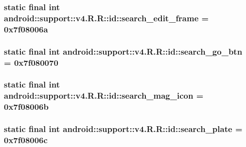 \hypertarget{classandroid_1_1support_1_1v4_1_1_r_1_1id_496a0719e8a5ad50616c8ab01c37c6da}{
\subsubsection[{search\_\-edit\_\-frame}]{\setlength{\rightskip}{0pt plus 5cm}static final int android::support::v4.R.R::id::search\_\-edit\_\-frame = 0x7f08006a}}
\label{classandroid_1_1support_1_1v4_1_1_r_1_1id_496a0719e8a5ad50616c8ab01c37c6da}


\hypertarget{classandroid_1_1support_1_1v4_1_1_r_1_1id_25f73c2a61d9352245d79baeccd50e54}{
\subsubsection[{search\_\-go\_\-btn}]{\setlength{\rightskip}{0pt plus 5cm}static final int android::support::v4.R.R::id::search\_\-go\_\-btn = 0x7f080070}}
\label{classandroid_1_1support_1_1v4_1_1_r_1_1id_25f73c2a61d9352245d79baeccd50e54}


\hypertarget{classandroid_1_1support_1_1v4_1_1_r_1_1id_d3a6e0108d570358fe7a1fa0cb6ae89b}{
\subsubsection[{search\_\-mag\_\-icon}]{\setlength{\rightskip}{0pt plus 5cm}static final int android::support::v4.R.R::id::search\_\-mag\_\-icon = 0x7f08006b}}
\label{classandroid_1_1support_1_1v4_1_1_r_1_1id_d3a6e0108d570358fe7a1fa0cb6ae89b}


\hypertarget{classandroid_1_1support_1_1v4_1_1_r_1_1id_6034ce67c615744bcdfdc7a54f5625ce}{
\subsubsection[{search\_\-plate}]{\setlength{\rightskip}{0pt plus 5cm}static final int android::support::v4.R.R::id::search\_\-plate = 0x7f08006c}}
\label{classandroid_1_1support_1_1v4_1_1_r_1_1id_6034ce67c615744bcdfdc7a54f5625ce}


